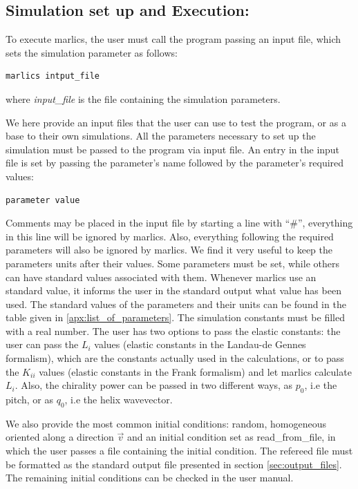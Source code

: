 \documentclass[final,5p,times,twocolumn]{elsarticle}
\begin{document}
\subsection{Simulation set up and Execution:}

To execute marlics, the user must call the program passing an input file, which sets the simulation parameter as follows:
\begin{lstlisting}
marlics intput_file
\end{lstlisting}
where \textit{input\_file} is the file containing the simulation
parameters.

We here provide an input files that the user can use to test the program, or as a base to their own simulations. All
the parameters necessary to set up the simulation must be passed to
the program via input file. An entry in the input file is set by passing the parameter's name
followed by the parameter's required values:
\begin{lstlisting}
parameter value
\end{lstlisting}
Comments may be placed in the input file by starting a line with ``\#'',
everything in this line will be ignored by marlics. Also, everything
following the required parameters will also be ignored by marlics. We
find it very useful to keep the parameters units after their values. Some parameters must be set, while others can have standard values associated with them. Whenever marlics use an standard value, it informs the user in the standard output what value has been used.
The standard values of the parameters and their units can be found in the table given in \ref{apx:list_of_parameters}. The simulation constants must be filled with a real number. The user has two options to pass the elastic constants: the user can pass the $L_i$ values (elastic constants in the Landau-de Gennes formalism), which are the constants actually used in the calculations, or to pass the $K_{ii}$ values (elastic constants in the Frank formalism) and let marlics calculate $L_i$. 
Also, the chirality power can be passed in two different ways, as $p_0$, i.e the pitch, or as $q_0$, i.e the helix wavevector.

We also provide the most common initial conditions: random, homogeneous oriented along a direction $\vec{v}$ and an initial condition set as read\_from\_file, in which the user passes a file containing the initial condition. The refereed file must be formatted as the standard output file presented in section \ref{sec:output_files}. The remaining initial conditions can be checked in the user manual.
\end{document}

